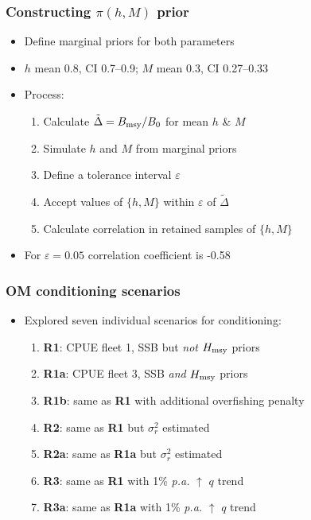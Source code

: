 \documentclass{beamer}
\newcommand{\veps}{\varepsilon}
\newcommand{\sigr}{\sigma^2_r}
\newcommand{\tdel}{\tilde\Delta}
\newcommand{\bmsy}{B_{\rm msy}}
\newcommand{\hmsy}{H_{\rm msy}}
\begin{document}
\begin{frame}
\frametitle{Constructing $\pi(h,M)$ prior}
\begin{itemize}
    \item Define marginal priors for both parameters
    \item $h$ mean 0.8, CI 0.7--0.9; $M$ mean 0.3, CI 0.27--0.33
    \item Process:
        \vspace{0.2cm}
        \begin{enumerate}
            \item Calculate $\tdel=\bmsy/B_0$ for mean $h$ \& $M$
            \item Simulate $h$ and $M$ from marginal priors
            \item Define a tolerance interval $\veps$
            \item Accept values of $\{h,M\}$ within $\veps$ of $\tdel$
            \item Calculate correlation in retained samples of $\{h,M\}$
        \end{enumerate}
        \vspace{0.2cm}
    \item For $\veps=0.05$ correlation coefficient is -0.58
\end{itemize}
\end{frame}
\begin{frame}
\frametitle{OM conditioning scenarios}
\begin{itemize}
  \item Explored seven individual scenarios for conditioning:
  \vspace{0.25cm}
  \begin{enumerate}
      \item \textbf{R1}: CPUE fleet 1, SSB but \emph{not} $\hmsy$ priors
      \item \textbf{R1a}: CPUE fleet 3, SSB \emph{and} $\hmsy$ priors 
      \item \textbf{R1b}: same as \textbf{R1} with additional overfishing penalty
      \item \textbf{R2}: same as \textbf{R1} but $\sigr$ estimated
      \item \textbf{R2a}: same as \textbf{R1a} but $\sigr$ estimated 
      \item \textbf{R3}: same as \textbf{R1} with 1\% \textit{p.a.} $\uparrow$ $q$ trend
      \item \textbf{R3a}: same as \textbf{R1a} with 1\% \textit{p.a.} $\uparrow$ $q$ trend
  \end{enumerate}
\end{itemize}
\end{frame}
\end{document}
